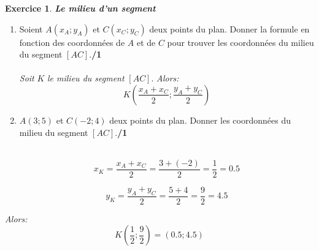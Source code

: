 \documentclass[a4paper,10pt]{article}
\theoremstyle{definition}
\newtheorem{exo}{Exercice}
\begin{document}
\begin{exo} \textit{\textbf{Le milieu d'un segment}}\\
\begin{enumerate}
    \item Soient $A \left(x_A;y_A\right)$ et $C \left(x_C;y_C\right)$ deux points du plan. Donner la formule en fonction des coordonnées de $A$ et de $C$ pour trouver les coordonnées du milieu du segment $[AC]$.\hfill\textbf{/1}\\\\
\textit{Soit} $K$ \textit{le milieu du segment} $[AC]$. 
\textit{Alors:} $$K\left(\dfrac{x_A + x_C}{2};\dfrac{y_A + y_C}{2}\right)$$
 \item $A \left(3;5\right)$ et $C \left(-2;4\right)$ deux points du plan. Donner les coordonnées du milieu du segment $[AC]$.\hfill\textbf{/1}\\\\
\begin{minipage}{1\linewidth}
\begin{minipage}{0.45\linewidth}
$$x_K = \dfrac{x_A + x_C}{2} =  \dfrac{3 + (-2)}{2} = \dfrac{1}{2} = 0.5 $$
\end{minipage}
\hfill
\begin{minipage}{0.45\linewidth}
$$y_K = \dfrac{y_A + y_C}{2} = \dfrac{5+4}{2} = \dfrac{9}{2} = 4.5$$
\end{minipage}
\end{minipage}
\end{enumerate}
\textit{Alors:} $$K\left(\dfrac{1}{2};\dfrac{9}{2}\right) = \left(0.5;4.5\right) $$
\end{exo}
\end{document}
